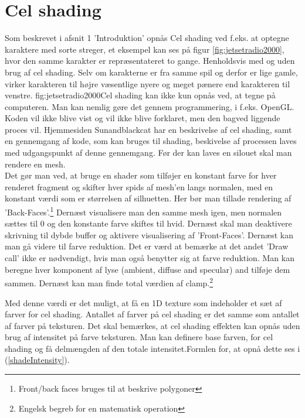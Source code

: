\section{Cel shading}
Som beskrevet i afsnit 1 'Introduktion' opnås Cel shading ved f.eks. at optegne karaktere med sorte streger, et eksempel kan ses på figur \ref{fig:jetsetradio2000}, hvor den samme karakter er repræsentateret to gange. Henholdsvis med og uden brug af cel shading. Selv om karakterne er fra samme spil og derfor er lige gamle, virker karakteren til højre væsentlige nyere og meget pænere end karakteren til venstre. {fig:jetsetradio2000}Cel shading kan ikke kun opnås ved, at tegne på computeren. Man kan nemlig gøre det gennem programmering, i f.eks. OpenGL. 
Koden vil ikke blive vist og vil ikke blive forklaret, men den bagved liggende proces vil. Hjemmesiden Sunandblackcat \cite{sunandblackcat2016} har en beskrivelse af cel shading, samt en gennemgang af kode, som kan bruges til shading, beskivelse af processen laves med udgangspunkt af denne gennemgang. Før der kan laves en silouet skal man rendere en mesh. \\
Det gør man ved, at bruge en shader som tilføjer en konstant farve for
hver renderet fragment og skifter hver spids af mesh’en langs normalen, med en konstant værdi
som er størrelsen af silhuetten. Her bør man tillade rendering af ’Back-Faces’.\footnote[1]
{Front/back faces bruges til at beskrive polygoner}
Dernæst visualisere man den samme mesh igen, men normalen sættes til 0 og den konstante farve
skiftes til hvid.\newpage 
Dernæst skal man deaktivere skrivning til dybde buffer og aktivere
visualisering af ’Front-Faces’. Dernæst kan man gå videre til farve reduktion. Det er værd at
bemærke at det andet ’Draw call’ ikke er nødvendigt, hvis man også benytter sig at farve
reduktion. 
Man kan beregne hver komponent af lyse (ambient, diffuse and specular) and tilføje dem sammen.
Dernæst kan man finde total værdien af clamp.\footnote[2]{Engelsk begreb for en matematisk
operation}

Med denne værdi er det muligt, at få en 1D texture som indeholder et sæt af farver for cel
shading. Antallet af farver på cel shading er det samme som antallet af farver på teksturen.
Det skal bemærkes, at cel shading effekten kan opnås uden brug af intensitet på farve
teksturen. 
Man kan definere base farven, for cel shading og få delmængden af den totale intensitet.Formlen
for, at opnå dette ses i (\ref{shadeIntensity}).

